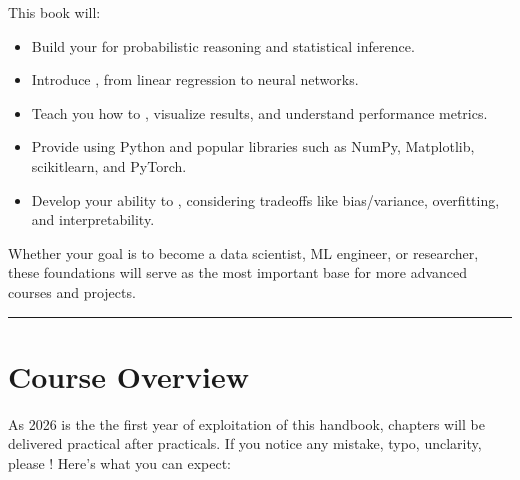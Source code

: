 \documentclass[letterpaper,10pt,english]{jupyterBook}
\begin{document}
\sphinxAtStartPar
This book will:
\begin{itemize}
\item {} 
\sphinxAtStartPar
Build your  for probabilistic reasoning and statistical inference.

\item {} 
\sphinxAtStartPar
Introduce , from linear regression to neural networks.

\item {} 
\sphinxAtStartPar
Teach you how to , visualize results, and understand performance metrics.

\item {} 
\sphinxAtStartPar
Provide  using Python and popular libraries such as NumPy, Matplotlib, scikit\sphinxhyphen{}learn, and PyTorch.

\item {} 
\sphinxAtStartPar
Develop your ability to , considering trade\sphinxhyphen{}offs like bias/variance, overfitting, and interpretability.

\end{itemize}

\sphinxAtStartPar
Whether your goal is to become a data scientist, ML engineer, or researcher, these foundations will serve as the most important base for more advanced courses and projects.


\bigskip\hrule\bigskip



\section{Course Overview}
\label{\detokenize{introduction:course-overview}}
\sphinxAtStartPar
As 2026 is the the first year of exploitation of this handbook, chapters will be delivered practical after practicals. If you notice any mistake, typo, unclarity, please  !
Here’s what you can expect:
\end{document}
